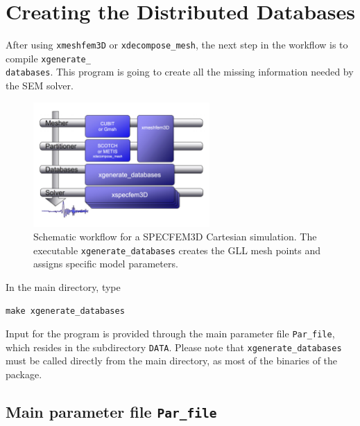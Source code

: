 \chapter{Creating the Distributed Databases}\label{cha:Creating-Distributed-Databases}

After using \texttt{xmeshfem3D} or \texttt{xdecompose\_mesh}, the
next step in the workflow is to compile \texttt{xgenerate\_}~\\
 \texttt{databases}. This program is going to create all the missing
information needed by the SEM solver.

\begin{figure}[htbp]
\begin{centering}
\includegraphics[width=0.6\textwidth]{figures/workflow.jpg}
\par
\end{centering}
\caption{Schematic workflow for a SPECFEM3D Cartesian simulation. The executable
\texttt{xgenerate\_databases} creates the GLL mesh points and assigns
specific model parameters.}
\label{fig:workflow.databases}
\end{figure}

\noindent
In the main directory, type
{\small
\begin{verbatim}
make xgenerate_databases
\end{verbatim}
}
\noindent
Input for the program is provided through the main parameter file
\texttt{Par\_file}, which resides in the subdirectory \texttt{DATA}.
Please note that \texttt{xgenerate\_databases} must be called directly
from the main directory, as most of the binaries of the package.


\section{Main parameter file \texttt{Par\_file}}\label{cha:Main-Parameter}

